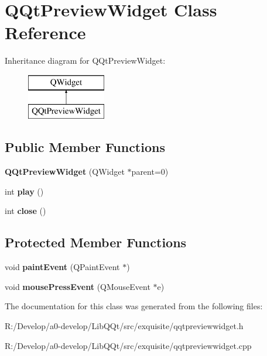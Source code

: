 \hypertarget{class_q_qt_preview_widget}{}\section{Q\+Qt\+Preview\+Widget Class Reference}
\label{class_q_qt_preview_widget}
Inheritance diagram for Q\+Qt\+Preview\+Widget\+:\begin{figure}[H]
\begin{center}
\leavevmode
\includegraphics[height=2.000000cm]{class_q_qt_preview_widget}
\end{center}
\end{figure}
\subsection*{Public Member Functions}
\begin{DoxyCompactItemize}
\item 
\mbox{\label{class_q_qt_preview_widget_aa2a64e14d209b5572557c33b7b6fb5ee}} 
{\bfseries Q\+Qt\+Preview\+Widget} (Q\+Widget $\ast$parent=0)
\item 
\mbox{\label{class_q_qt_preview_widget_a55d0eea0baac137c5d23288341a77021}} 
int {\bfseries play} ()
\item 
\mbox{\label{class_q_qt_preview_widget_a37eb5b6c0cfd47060d69d2feaf1a648b}} 
int {\bfseries close} ()
\end{DoxyCompactItemize}
\subsection*{Protected Member Functions}
\begin{DoxyCompactItemize}
\item 
\mbox{\label{class_q_qt_preview_widget_a005012289a0d37bb0a340d3753c45dfe}} 
void {\bfseries paint\+Event} (Q\+Paint\+Event $\ast$)
\item 
\mbox{\label{class_q_qt_preview_widget_af7138bad605d77da89bdd455e3bf99d3}} 
void {\bfseries mouse\+Press\+Event} (Q\+Mouse\+Event $\ast$e)
\end{DoxyCompactItemize}


The documentation for this class was generated from the following files\+:\begin{DoxyCompactItemize}
\item 
R\+:/\+Develop/a0-\/develop/\+Lib\+Q\+Qt/src/exquisite/qqtpreviewwidget.\+h\item 
R\+:/\+Develop/a0-\/develop/\+Lib\+Q\+Qt/src/exquisite/qqtpreviewwidget.\+cpp\end{DoxyCompactItemize}
